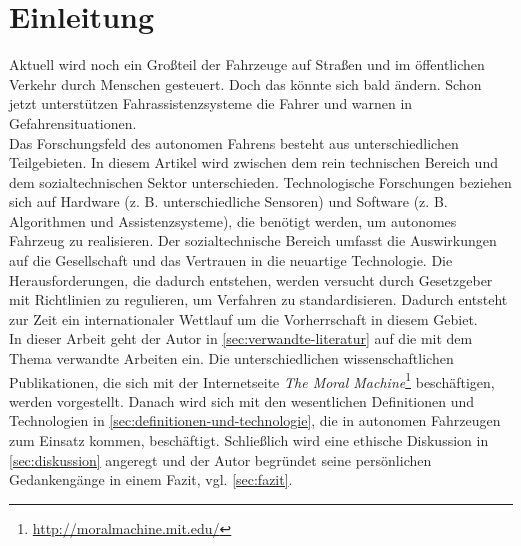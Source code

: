 \section{Einleitung}

Aktuell wird noch ein Großteil der Fahrzeuge auf Straßen und im öffentlichen Verkehr durch Menschen gesteuert. Doch das könnte sich bald ändern. Schon jetzt unterstützen Fahrassistenzsysteme die Fahrer und warnen in Gefahrensituationen.\\

Das Forschungsfeld des autonomen Fahrens besteht aus unterschiedlichen Teilgebieten. In diesem Artikel wird zwischen dem rein technischen Bereich und dem sozialtechnischen Sektor unterschieden. Technologische Forschungen beziehen sich auf Hardware (z. B. unterschiedliche Sensoren) und Software (z. B. Algorithmen und Assistenzsysteme), die benötigt werden, um autonomes Fahrzeug zu realisieren. Der sozialtechnische Bereich umfasst die Auswirkungen auf die Gesellschaft und das Vertrauen in die neuartige Technologie. Die Herausforderungen, die dadurch entstehen, werden versucht durch Gesetzgeber mit Richtlinien zu regulieren, um Verfahren zu standardisieren. Dadurch entsteht zur Zeit ein internationaler Wettlauf um die Vorherrschaft in diesem Gebiet.\\

In dieser Arbeit geht der Autor in \ref{sec:verwandte-literatur} auf die mit dem Thema verwandte Arbeiten ein. Die unterschiedlichen wissenschaftlichen Publikationen, die sich mit der Internetseite \textit{The Moral Machine}\footnote{\url{http://moralmachine.mit.edu/}} beschäftigen, werden vorgestellt. Danach wird sich mit den wesentlichen Definitionen und Technologien in \ref{sec:definitionen-und-technologie}, die in autonomen Fahrzeugen zum Einsatz kommen, beschäftigt. Schließlich wird eine ethische Diskussion in \ref{sec:diskussion} angeregt und der Autor begründet seine persönlichen Gedankengänge in einem Fazit, vgl. \ref{sec:fazit}.